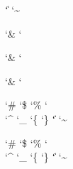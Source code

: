  \ctxcatcodes  `\|   \relax
{} \ctxcatcodes  `\~   \relax


 \xmlcatcodesn `\&   \relax
{} \xmlcatcodesn `\<   \relax

 \xmlcatcodese `\&   \relax
{} \xmlcatcodese `\<   \relax

 \xmlcatcodesr `\&   \relax
{} \xmlcatcodesr `\<   \relax

 \xmlcatcodese `\#   \relax
{} \xmlcatcodese `\$   \relax
{} \xmlcatcodese `\%   \relax
{} \xmlcatcodese `\\   \relax
{} \xmlcatcodese `\^   \relax
{} \xmlcatcodese `\_   \relax
{} \xmlcatcodese `\{   \relax
{} \xmlcatcodese `\}   \relax
{} \xmlcatcodese `\|   \relax
{} \xmlcatcodese `\~   \relax

 \xmlcatcodesr `\#   \relax
{} \xmlcatcodesr `\$   \relax
{} \xmlcatcodesr `\%   \relax
{} \xmlcatcodesr `\\   \relax
{} \xmlcatcodesr `\^   \relax
{} \xmlcatcodesr `\_   \relax
{} \xmlcatcodesr `\{   \relax
{} \xmlcatcodesr `\}   \relax
{} \xmlcatcodesr `\|   \relax
{} \xmlcatcodesr `\~   \relax

    \catcodetable       \ctxcatcodes
\let\defaultcatcodetable\ctxcatcodes
\let\xmlcatcodes        \xmlcatcodesn



